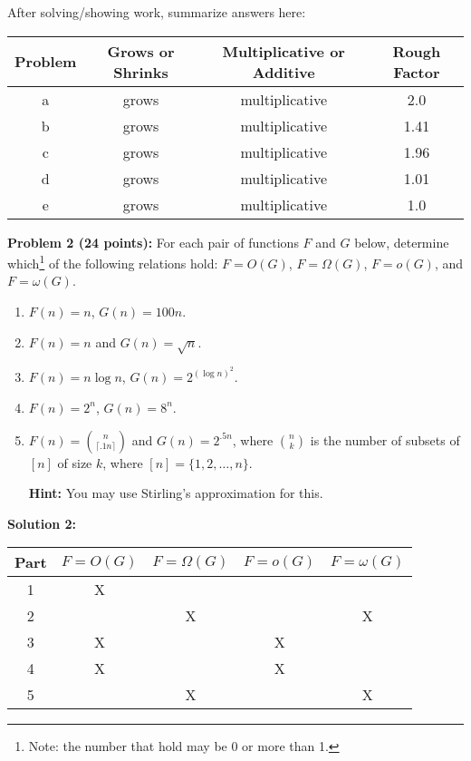 \documentclass[11pt]{article}
\newcommand{\binom}[2]{{#1 \choose #2}}
\begin{document}
After solving/showing work, summarize answers here:

\begin{center}
\begin{tabular}{ |c|c|c|c| }
 \hline
 Problem & Grows or Shrinks & Multiplicative or Additive & Rough Factor \\
 \hline
 a & grows & multiplicative & 2.0 \\
 \hline
 b & grows & multiplicative & 1.41 \\
 \hline
 c & grows & multiplicative & 1.96 \\
 \hline
 d & grows & multiplicative & 1.01 \\
 \hline
 e & grows & multiplicative & 1.0 \\
 \hline
\end{tabular}
\end{center}

\newpage

\textbf{Problem 2 (24 points):}
For each pair of functions  $F$ and $G$ below, determine
which\footnote{Note: the number that hold may be 0 or more than 1.} of the following relations hold: $F = O(G)$, $F = \Omega(G)$,
$F = o(G)$, and $F = \omega(G)$.
\begin{enumerate}
	\item $F(n) = n$, $G(n) = 100n$.
	\item $F(n) = n$ and $G(n) = \sqrt{n}$.
	\item $F(n) = n \log n$, $G(n) = 2^{(\log n)^2}$.
    \item $F(n) = 2^n$, $G(n) = 8^n$.
    \item $F(n) = \binom{n}{\lceil .1 n \rceil}$ and $G(n) = 2^{.5 n}$, where $\binom{n}k$ is the number of subsets of $[n]$ of size $k$, where $[n] = \{1, 2, \ldots, n\}$.

{\bf Hint:} You may use Stirling's approximation for this.
\end{enumerate}

\textbf{Solution 2:} %

\begin{table}[H]
	\centering
	\begin{tabular}{|c|c|c|c|c|}
	\hline
	\multicolumn{1}{|l|}{Part} &
	  \multicolumn{1}{l|}{$F = O(G)$} &
	  \multicolumn{1}{l|}{$F = \Omega(G)$} &
	  \multicolumn{1}{l|}{$F = o(G)$} &
	  \multicolumn{1}{l|}{$F = \omega(G)$} \\ \hline
	1 & X &   &   &   \\ \hline
	2 &   & X &   & X \\ \hline
	3 & X &   & X &   \\ \hline
	4 & X &   & X &   \\ \hline
	5 &   & X &   & X \\ \hline
	\end{tabular}
\end{table}
\end{document}
